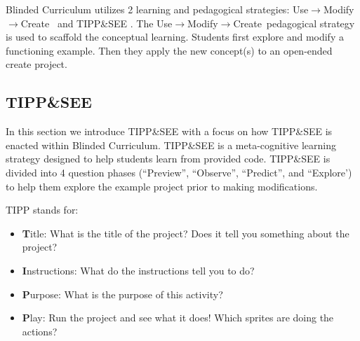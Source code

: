 \documentclass[sigconf,manuscript,review,anonymous]{acmart} %
\def\ts{TIPP\&SEE}
\def\umc{Use\begin{math}\rightarrow\end{math}Modify\begin{math}\rightarrow\end{math}Create\ }
\newcommand{\Scratchencore}[0]{Blinded Curriculum}
\begin{document}
\Scratchencore{} utilizes 2 learning and pedagogical strategies: \umc \cite{lee2011} and \ts{} \cite{salac2020tippnsee}. The \umc pedagogical strategy is used to scaffold the conceptual learning. Students first explore and modify a functioning example. Then they apply the new concept(s) to an open-ended create project\cite{authors}. %

\subsection{\ts{}}
In this section we introduce \ts{} with a focus on how \ts{} is enacted within \Scratchencore{}. \ts{} is a meta-cognitive learning strategy designed to help students learn from provided code. %
\ts{} is divided into 4 question phases (``Preview'', ``Observe'', ``Predict'', and ``Explore') to help them explore the example project prior to making modifications. %

TIPP stands for:
\begin{itemize}
    \item \textbf{T}itle: What is the title of the project? Does it tell you something about the project?
    \item \textbf{I}nstructions: What do the instructions tell you to do?
    \item \textbf{P}urpose: What is the purpose of this activity?
    \item \textbf{P}lay: Run the project and see what it does! Which sprites are doing the actions?
\end{itemize}
\end{document}
